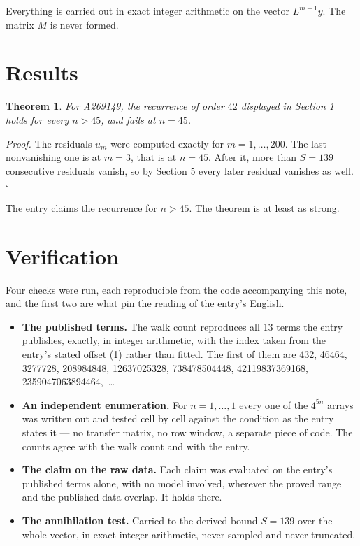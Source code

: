 \documentclass[11pt]{article}
\newtheorem{theorem}{Theorem}
\theoremstyle{definition}
\begin{document}
Everything is carried out in exact integer arithmetic on the vector $L^{m-1}y$. The matrix $M$ is never formed.

\section{Results}

\begin{theorem} For A269149, the recurrence of order $42$ displayed in Section 1 holds for every $n > 45$, and fails at $n = 45$.\end{theorem}

{\itshape Proof.} The residuals $u_m$ were computed exactly for $m = 1,\dots,200$. The last nonvanishing one is at $m = 3$, that is at $n = 45$. After it, more than $S = 139$ consecutive residuals vanish, so by Section 5 every later residual vanishes as well. $\square$

The entry claims the recurrence for $n > 45$. The theorem is at least as strong.

\section{Verification}

Four checks were run, each reproducible from the code accompanying this note, and the first two are what pin the reading of the entry's English.

\begin{itemize}

\item {\bfseries The published terms.} The walk count reproduces all 13 terms the entry publishes, exactly, in integer arithmetic, with the index taken from the entry's stated offset (1) rather than fitted. The first of them are 432, 46464, 3277728, 208984848, 12637025328, 738478504448, 42119837369168, 2359047063894464,~\dots

\item {\bfseries An independent enumeration.} For $n = 1,\dots,1$ every one of the $4^{5n}$ arrays was written out and tested cell by cell against the condition as the entry states it --- no transfer matrix, no row window, a separate piece of code. The counts agree with the walk count and with the entry.

\item {\bfseries The claim on the raw data.} Each claim was evaluated on the entry's published terms alone, with no model involved, wherever the proved range and the published data overlap. It holds there.

\item {\bfseries The annihilation test.} Carried to the derived bound $S = 139$ over the whole vector, in exact integer arithmetic, never sampled and never truncated.

\end{itemize}
\end{document}
